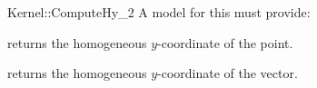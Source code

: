 \begin{ccRefFunctionObjectConcept}{Kernel::ComputeHy_2}
A model for this must provide:


       {returns the homogeneous $y$-coordinate of the point.}

       {returns the homogeneous $y$-coordinate of the vector.}

\ccRefines
{}



\end{ccRefFunctionObjectConcept}
